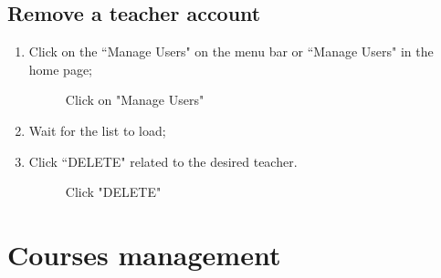 \documentclass[ManualeUtente]{subfiles}
\begin{document}
\subsection{Remove a teacher account}
\begin{enumerate}
	\item Click on the \textquotedblleft Manage Users" on the menu bar or \textquotedblleft Manage Users" in the home page;
	\begin{figure}[H]
		\centering
		\caption{Click on "Manage Users"}
		\label{fig:Click on "Manage Users"}
	\end{figure}
	\item Wait for the list to load;
	\item Click \textquotedblleft DELETE" related to the desired teacher.
	\begin{figure}[H]
		\centering
		\caption{Click "DELETE"}
		\label{fig:Click "DELETE"}
	\end{figure}
\end{enumerate}


\section{Courses management}
\end{document}
